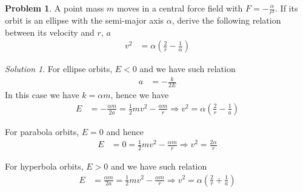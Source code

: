 \documentclass[twoside,11pt]{article}
\newcommand{\lms}{\fontfamily{lmss}\selectfont} %
\theoremstyle{definition}
\newtheorem{problem}{\lms Problem}
\theoremstyle{remark}
\newtheorem*{solution}{\lms Solution}
\begin{document}
\begin{problem}
A point mass $m$ moves in a central force field with $F=-\frac{\alpha}{r^2}$.
If its orbit is an ellipse with the semi-major axis $\alpha$, derive the following
relation between its velocity and $r$, $a$
\begin{align}
    v^2 &= 
    \alpha
    \left(
        \frac{2}{r} - \frac{1}{\alpha}
    \right)
\end{align}
\end{problem}
\begin{solution}
For ellipse orbits, $E<0$ and we have such relation
\begin{align*}
    a &= -\frac{k}{2E}
\end{align*}
In this case we have $k=\alpha m$, hence we have
\begin{align*}
    E &=  -\frac{\alpha m}{2a} = \frac{1}{2}m v^2 - \frac{\alpha m}{r}\Rightarrow
    v^2 = \alpha\left(\frac{2}{r} - \frac{1}{a}\right) 
\end{align*}

For parabola orbits, $E=0$ and hence
\begin{align*}
    E &= 0 = \frac{1}{2}m v^2 - \frac{\alpha m}{r}\Rightarrow
    v^2 = \frac{2\alpha}{r}
\end{align*}

For hyperbola orbits, $E>0$  and we have such relation
\begin{align*}
    E &=  \frac{\alpha m}{2a} = \frac{1}{2}m v^2 - \frac{\alpha m}{r}\Rightarrow
    v^2 = \alpha\left(\frac{2}{r} + \frac{1}{a}\right)
\end{align*}

\end{solution}
\end{document}
